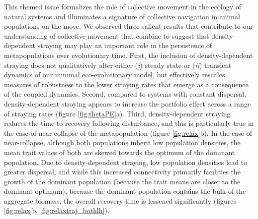 \documentclass{revtex4}
\begin{document}
This themed issue formalizes the role of collective movement in the ecology of natural systems and illuminates a signature of collective navigation in animal populations on the move.
We observed three salient results that contribute to our understanding of collective movement that combine to suggest that density-dependent straying may play an important role in the persistence of metapopulations over evolutionary time.
First, the inclusion of density-dependent straying does not qualitatively alter either (\emph{i}) steady state or (\emph{ii}) transient dynamics of our minimal eco-evolutionary model, but effectively rescales measures of robustness to the lower straying rates that emerge as a consequence of the coupled dynamics.
Second, compared to systems with constant dispersal, density-dependent straying appears to increase the portfolio effect across a range of straying rates (figure \ref{fig:thetaPE}a). 
Third, density-dependent straying reduces the time to recovery following disturbance, and this is particularly true in the case of near-collapse of the metapopulation (figure \ref{fig:relax}b).
In the case of near-collapse, although both populations inherit low population densities, the mean trait values of both are skewed towards the optimum of the dominant population.
Due to density-dependent straying, low population densities lead to greater dispersal, and while this increased connectivity primarily facilities the growth of the dominant population (because the trait means are closer to the dominant optimum), because the dominant population contains the bulk of the aggregate biomass, the overall recovery time is lessened significantly (figures \ref{fig:relax}b, \ref{fig:relaxtraj_bothlh}).



\end{document}
